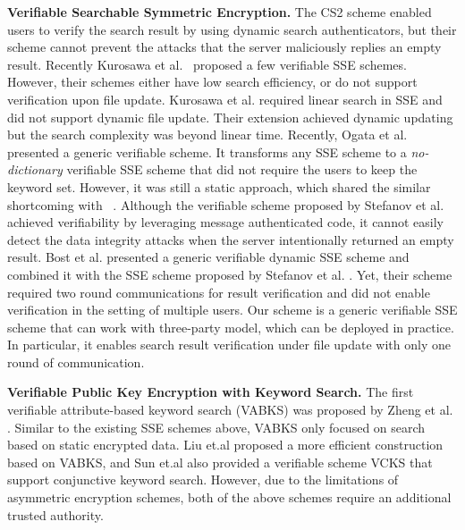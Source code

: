   \noindent\textbf{Verifiable Searchable Symmetric Encryption.} The CS2 scheme \cite{kamara2011cs2} enabled users to verify the search result by using dynamic search authenticators, but their scheme cannot prevent the attacks that the server maliciously replies an empty result.
  Recently Kurosawa et al.~\cite{kurosawa2012uc,kurosawa2013update,ogataefficient} proposed a few verifiable SSE schemes. However, their schemes either have low search efficiency, or do not support verification upon file update.
  Kurosawa et al. \cite{kurosawa2012uc} required linear search in SSE and did not support dynamic file update. Their extension \cite{kurosawa2013update} achieved dynamic updating but the search complexity was beyond linear time. Recently, Ogata et al. \cite{ogataefficient} presented a generic verifiable scheme. It transforms any SSE scheme to a \textit{no-dictionary} verifiable SSE scheme that did not require the users to keep the keyword set. However, it was still a static approach, which shared the similar shortcoming with~\cite{chai2012verifiable} \cite{cheng2015verifiable}.
  Although the verifiable scheme proposed by Stefanov et al.\cite{stefanov2014practical} achieved verifiability by leveraging message authenticated code, it cannot easily detect the data integrity attacks when the server intentionally returned an empty result.
  Bost et al. \cite{bost2016verifiable} presented a generic verifiable dynamic SSE scheme and combined it with the SSE scheme proposed by Stefanov et al. \cite{stefanov2014practical}.
  Yet, their scheme required two round communications for result verification and did not enable verification in the setting of multiple users. Our \name scheme is a generic verifiable SSE scheme that can work with three-party model, which can be  deployed in practice. In particular, it enables search result verification under file update with only one round of communication.


  \noindent\textbf{Verifiable Public Key Encryption with Keyword Search.} The first verifiable attribute-based keyword search (VABKS) was proposed by Zheng et al. \cite{zheng2014vabks}. Similar to the existing SSE schemes above, VABKS only focused on search based on static encrypted data. Liu et.al \cite{liu2014efficient} proposed a more efficient construction based on VABKS, and Sun et.al \cite{sun2015catch} also provided a verifiable scheme VCKS that support conjunctive keyword search. However, due to the limitations of asymmetric encryption schemes, both of the above schemes require an additional trusted authority.


